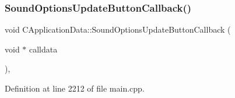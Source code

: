\hypertarget{classCApplicationData_ae63c8ca19ddeb92a3aaf0a5d67d09e58}{}\label{classCApplicationData_ae63c8ca19ddeb92a3aaf0a5d67d09e58} 
\subsubsection{\texorpdfstring{Sound\+Options\+Update\+Button\+Callback()}{SoundOptionsUpdateButtonCallback()}}
{\footnotesize\ttfamily void C\+Application\+Data\+::\+Sound\+Options\+Update\+Button\+Callback (\begin{DoxyParamCaption}\item[{void $\ast$}]{calldata }\end{DoxyParamCaption})\hspace{0.3cm}{\ttfamily [static]}, {\ttfamily [protected]}}



Definition at line 2212 of file main.\+cpp.


